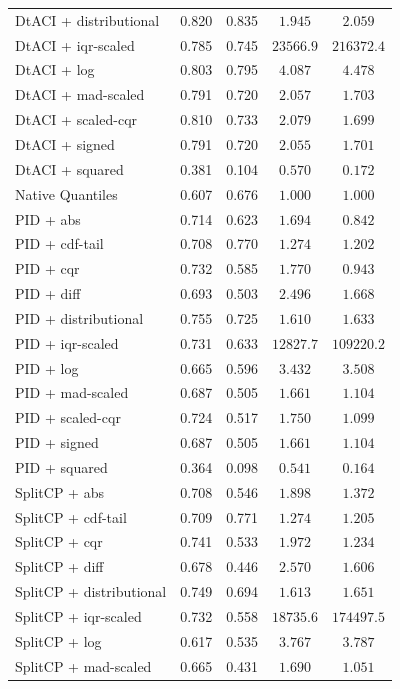 \begin{longtable}{lcccc}
	DtACI + distributional & 0.820 & 0.835 & $1.945$ & $2.059$ \\
	DtACI + iqr-scaled & 0.785 & 0.745 & $23566.9$ & $216372.4$ \\
	DtACI + log & 0.803 & 0.795 & $4.087$ & $4.478$ \\
	DtACI + mad-scaled & 0.791 & 0.720 & $2.057$ & $1.703$ \\
	DtACI + scaled-cqr & 0.810 & 0.733 & $2.079$ & $1.699$ \\
	DtACI + signed & 0.791 & 0.720 & $2.055$ & $1.701$ \\
	DtACI + squared & 0.381 & 0.104 & $0.570$ & $0.172$ \\
	Native Quantiles & 0.607 & 0.676 & $1.000$ & $1.000$ \\
	PID + abs & 0.714 & 0.623 & $1.694$ & $0.842$ \\
	PID + cdf-tail & 0.708 & 0.770 & $1.274$ & $1.202$ \\
	PID + cqr & 0.732 & 0.585 & $1.770$ & $0.943$ \\
	PID + diff & 0.693 & 0.503 & $2.496$ & $1.668$ \\
	PID + distributional & 0.755 & 0.725 & $1.610$ & $1.633$ \\
	PID + iqr-scaled & 0.731 & 0.633 & $12827.7$ & $109220.2$ \\
	PID + log & 0.665 & 0.596 & $3.432$ & $3.508$ \\
	PID + mad-scaled & 0.687 & 0.505 & $1.661$ & $1.104$ \\
	PID + scaled-cqr & 0.724 & 0.517 & $1.750$ & $1.099$ \\
	PID + signed & 0.687 & 0.505 & $1.661$ & $1.104$ \\
	PID + squared & 0.364 & 0.098 & $0.541$ & $0.164$ \\
	SplitCP + abs & 0.708 & 0.546 & $1.898$ & $1.372$ \\
	SplitCP + cdf-tail & 0.709 & 0.771 & $1.274$ & $1.205$ \\
	SplitCP + cqr & 0.741 & 0.533 & $1.972$ & $1.234$ \\
	SplitCP + diff & 0.678 & 0.446 & $2.570$ & $1.606$ \\
	SplitCP + distributional & 0.749 & 0.694 & $1.613$ & $1.651$ \\
	SplitCP + iqr-scaled & 0.732 & 0.558 & $18735.6$ & $174497.5$ \\
	SplitCP + log & 0.617 & 0.535 & $3.767$ & $3.787$ \\
	SplitCP + mad-scaled & 0.665 & 0.431 & $1.690$ & $1.051$ \\

\end{longtable}
